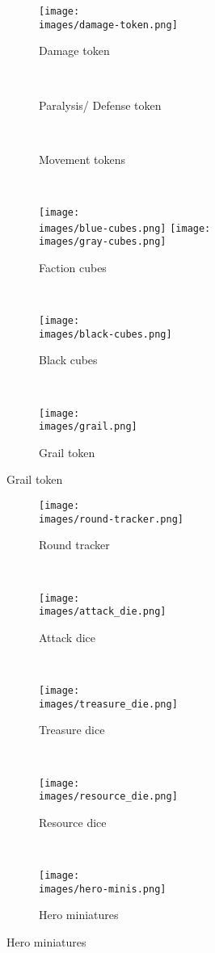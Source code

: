 \begin{figure}[H]
  \centering
  \begin{subfigure}[b]{0.08\linewidth}
    \centering
    \texttt{[image: \\images/damage-token.png]}
    \caption{\centering Damage token}
  \end{subfigure}
  ~
  \begin{subfigure}[b]{0.15\linewidth}
    \caption{\centering Paralysis/ Defense token}
  \end{subfigure}
  ~
  \begin{subfigure}[b]{0.15\linewidth}
    
    \caption{\centering Movement tokens}
  \end{subfigure}
  ~
  \begin{subfigure}[b]{0.15\linewidth}
    \centering
    \texttt{[image: \\images/blue-cubes.png]}
    \texttt{[image: \\images/gray-cubes.png]}
    \caption{\centering Faction cubes}
  \end{subfigure}
  ~
  \begin{subfigure}[b]{0.15\linewidth}
    \texttt{[image: \\images/black-cubes.png]}
    \caption{\centering Black cubes}
  \end{subfigure}
  ~
  \begin{subfigure}[b]{0.15\linewidth}
    \texttt{[image: \\images/grail.png]}
    \caption{\centering Grail token}
  \end{subfigure}
\end{figure}
\vspace*{-2em}
\begin{figure}[H]
  \centering
  \begin{subfigure}[b]{0.3\linewidth}
    \texttt{[image: \\images/round-tracker.png]}
    \caption{\centering Round tracker}
  \end{subfigure}
  ~
  \begin{subfigure}[b]{0.07\linewidth}
    \texttt{[image: \\images/attack\_die.png]}
    \caption{\centering Attack dice}
  \end{subfigure}
  ~
  \begin{subfigure}[b]{0.1\linewidth}
    \texttt{[image: \\images/treasure\_die.png]}
    \caption{\centering Treasure dice}
  \end{subfigure}
  ~
  \begin{subfigure}[b]{0.1\linewidth}
    \texttt{[image: \\images/resource\_die.png]}
    \caption{\centering Resource dice}
  \end{subfigure}
  ~
  \begin{subfigure}[b]{0.3\linewidth}
    \texttt{[image: \\images/hero-minis.png]}
    \vspace*{-2em}
    \caption{\centering Hero miniatures}
  \end{subfigure}
\end{figure}
